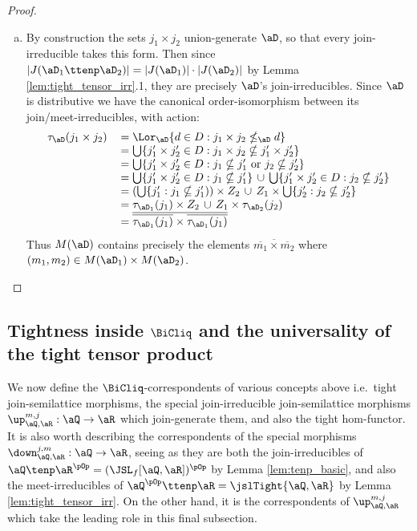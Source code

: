 \documentclass{article}
\begin{document}
\begin{proof}
\begin{enumerate}
\begin{enumerate}[(a)]
\item
By construction the sets $j_1 \times j_2$ union-generate $\aD$, so that every join-irreducible takes this form. Then since $|J(\aD_1 \ttenp \aD_2)| = |J(\aD_1)| \cdot |J(\aD_2)|$ by Lemma \ref{lem:tight_tensor_irr}.1, they are precisely $\aD$'s join-irreducibles. Since $\aD$ is distributive we have the canonical order-isomorphism between its join/meet-irreducibles, with action:
\[
\begin{tabular}{lll}
$\tau_\aD(j_1 \times j_2)$
&
$= \Lor_{\aD} \{ d \in D : j_1 \times j_2 \nleq_\aD d \}$
\\&
$= \bigcup \{ j'_1 \times j'_2 \in D : j_1 \times j_2 \nsubseteq j'_1 \times j'_2 \}$
\\&
$= \bigcup \{ j'_1 \times j'_2 \in D : j_1 \nsubseteq j'_1 \text{ or } j_2 \nsubseteq j'_2 \}$
\\&
$= \bigcup \{ j'_1 \times j'_2 \in D : j_1 \nsubseteq j'_1 \} \,\cup\, \bigcup \{ j'_1 \times j'_2 \in D : j_2 \nsubseteq j'_2 \}$
\\&
$= (\bigcup \{j'_1 : j_1 \nsubseteq j'_1)) \times Z_2 \,\cup\, Z_1 \times \bigcup \{ j'_2 : j_2 \nsubseteq j'_2 \}$ 
\\&
$= \tau_{\aD_1}(j_1) \times Z_2 \,\cup\, Z_1 \times \tau_{\aD_2}(j_2)$
\\&
$= \overline{\overline{\tau_{\aD_1}(j_1)} \times \overline{\tau_{\aD_1}(j_1)}}$
\end{tabular}
\]
Thus $M(\aD)$ contains precisely the elements $\overline{\overline{m_1} \times \overline{m_2}}$ where $(m_1,m_2) \in M(\aD_1) \times M(\aD_2)$.
\end{enumerate}
\end{enumerate}
\end{proof}



\subsection{Tightness inside $\BiCliq$ and the universality of the tight tensor product}

We now define the $\BiCliq$-correspondents of various concepts  above i.e.\ tight join-semilattice morphisms, the special join-irreducible join-semilattice morphisms $\up_{\aQ,\aR}^{m,j} : \aQ \to \aR$ which join-generate them, and also the tight hom-functor. It is also worth describing the correspondents of the special morphisms $\down_{\aQ,\aR}^{j,m} : \aQ \to \aR$, seeing as they are both the join-irreducibles of $\aQ \tenp \aR^{\pOp} = (\JSL_f[\aQ,\aR])^{\pOp}$ by Lemma \ref{lem:tenp_basic}, and also the meet-irreducibles of  $\aQ^{\pOp} \ttenp \aR = \jslTight{\aQ,\aR}$ by Lemma \ref{lem:tight_tensor_irr}. On the other hand, it is the correspondents of $\up_{\aQ,\aR}^{m,j}$ which take the leading role in this final subsection.
\end{document}
